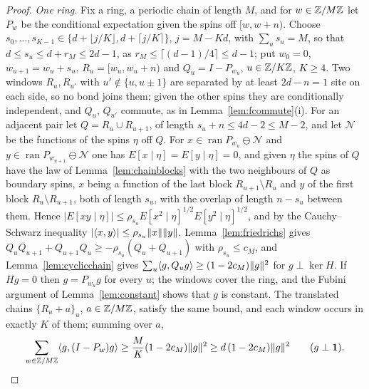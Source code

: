 \begin{proof}
\emph{One ring.} Fix a ring, a periodic chain of length $M$, and for
$w\in\mathbb{Z}/M\mathbb{Z}$ let $P_w$ be the conditional expectation given the spins off
$[w,w+n)$. Choose $s_0,\dots,s_{K-1}\in\{d+\lfloor j/K\rfloor,d+\lceil j/K
\rceil\}$, $j=M-Kd$, with $\sum_us_u=M$, so that $d\le s_u\le d+r_M\le2d-1$,
as $r_M\le\lceil(d-1)/4\rceil\le d-1$; put $w_0=0$, $w_{u+1}=w_u+s_u$,
$R_u=[w_u,w_u+n)$ and $Q_u=I-P_{w_u}$, $u\in\mathbb{Z}/K\mathbb{Z}$, $K\ge4$. Two windows
$R_u,R_{u'}$ with $u'\notin\{u,u\pm1\}$ are separated by at least $2d-n=1$
site on each side, so no bond joins them; given the other spins they are
conditionally independent, and $Q_u$, $Q_{u'}$ commute, as in
Lemma~\ref{lem:fcommute}(i). For an adjacent pair let $Q=R_u\cup R_{u+1}$, of
length $s_u+n\le4d-2\le M-2$, and let $\mathcal N$ be the functions of the
spins $\eta$ off $Q$. For $x\in\operatorname{ran}P_{w_u}\ominus\mathcal N$
and $y\in\operatorname{ran}P_{w_{u+1}}\ominus\mathcal N$ one has
$E[x\mid\eta]=E[y\mid\eta]=0$, and given $\eta$ the spins of $Q$ have the law
of Lemma~\ref{lem:chainblocks} with the two neighbours of $Q$ as boundary
spins, $x$ being a function of the last block $R_{u+1}\setminus R_u$ and $y$
of the first block $R_u\setminus R_{u+1}$, both of length $s_u$, with the
overlap of length $n-s_u$ between them. Hence $|E[xy\mid\eta]|\le\rho_{s_u}
E[x^2\mid\eta]^{1/2}E[y^2\mid\eta]^{1/2}$, and by the Cauchy--Schwarz
inequality $|\langle x,y\rangle|\le\rho_{s_u}\|x\|\|y\|$. Lemma~\ref{lem:friedrichs} gives
$Q_uQ_{u+1}+Q_{u+1}Q_u\ge-\rho_{s_u}(Q_u+Q_{u+1})$ with $\rho_{s_u}\le c_M$,
and Lemma~\ref{lem:cyclicchain} gives $\sum_u\langle g,Q_ug\rangle\ge(1-2c_M)\|g\|^2$
for $g\perp\ker H$. If $Hg=0$ then $g=P_{w_u}g$ for every $u$; the windows
cover the ring, and the Fubini argument of Lemma~\ref{lem:constant} shows
that $g$ is constant. The translated chains $\{R_u+a\}_u$, $a\in\mathbb{Z}/M\mathbb{Z}$,
satisfy the same bound, and each window occurs in exactly $K$ of them;
summing over $a$,
\[
\sum_{w\in\mathbb{Z}/M\mathbb{Z}}\langle g,(I-P_w)g\rangle\ge\frac MK(1-2c_M)\|g\|^2\ge d\,(1-2c_M)
\|g\|^2\qquad(g\perp\mathbf1).
\]


\end{proof}
